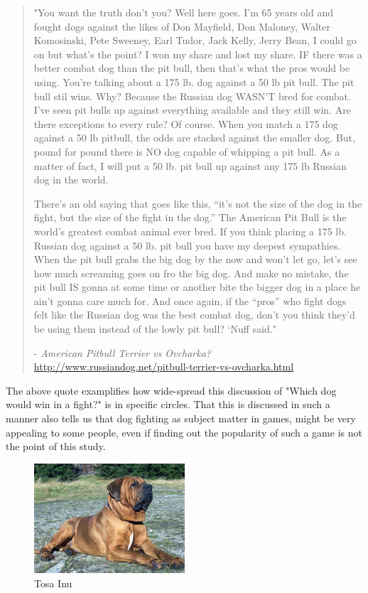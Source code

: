\blockquote{"You want the truth don’t you? Well here goes. I’m 65 years old and fought dogs against the likes of Don Mayfield, Don Maloney, Walter Komosinski, Pete Sweeney, Earl Tudor, Jack Kelly, Jerry Bean, I could go on but what’s the point? I won my share and lost my share. IF there was a better combat dog than the pit bull, then that’s what the pros would be using. You’re talking about a 175 lb. dog against a 50 lb pit bull. The pit bull stil wins. Why? Because the Russian dog WASN’T bred for combat. I’ve seen pit bulls up against everything available and they still win. Are there exceptions to every rule? Of course. When you match a 175 dog against a 50 lb pitbull, the odds are stacked against the smaller dog. But, pound for pound there is NO dog capable of whipping a pit bull. As a matter of fact, I will put a 50 lb. pit bull up against any 175 lb Russian dog in the world. \

There’s an old saying that goes like this, “it’s not the size of the dog in the fight, but the size of the fight in the dog.” The American Pit Bull is the world’s greatest combat animal ever bred. If you think placing a 175 lb. Russian dog against a 50 lb. pit bull you have my deepest sympathies. When the pit bull grabs the big dog by the now and won’t let go, let’s see how much screaming goes on fro the big dog. And make no mistake, the pit bull IS gonna at some time or another bite the bigger dog in a place he ain’t gonna care much for. And once again, if the “pros” who fight dogs felt like the Russian dog was the best combat dog, don’t you think they’d be using them instead of the lowly pit bull? ‘Nuff said."\

- \textit{American Pitbull Terrier vs Ovcharka?} \url{http://www.russiandog.net/pitbull-terrier-vs-ovcharka.html}
\label{pitbullQuote}}

The above quote examplifies how wide-spread this discussion of "Which dog would win in a fight?" is in specific circles. That this is discussed in such a manner also tells us that dog fighting as subject matter in games, might be very appealing to some people, even if finding out the popularity of such a game is not the point of this study. 

\begin{figure} 
	\centering
    \includegraphics[width=0.5\textwidth]{tosa.jpg}
    \caption{Tosa Inu}
    \label{fig:tosa}
\end{figure}

